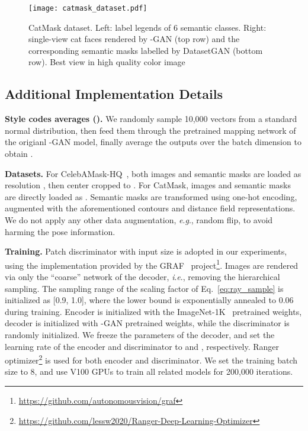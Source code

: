 \documentclass[runningheads]{llncs}
\newcommand{\ie}{\textit{i}.\textit{e}.}
\newcommand{\eg}{\textit{e}.\textit{g}.}
\begin{document}
\begin{figure}[t!]
    \centering
    \texttt{[image: catmask\_dataset.pdf]}
\caption{CatMask dataset. Left: label legends of 6 semantic classes. Right: single-view cat faces rendered by -GAN (top row) and the corresponding semantic masks labelled by DatasetGAN (bottom row). Best view in high quality color image}
\label{fig:catmask_dataset}
\end{figure}


\subsection{Additional Implementation Details} \label{sec:tech_imple}

\textbf{Style codes averages ().} We randomly sample 10,000 vectors  from a standard normal distribution, then feed them through the pretrained mapping network of the origianl -GAN model, finally average the outputs over the batch dimension to obtain .

\textbf{Datasets.} For CelebAMask-HQ~\cite{lee2020maskgan}, both images and semantic masks are loaded as resolution , then center cropped to . For CatMask, images and semantic masks are directly loaded as . Semantic masks are transformed using one-hot encoding, augmented with the aforementioned contours and distance field representations. We do not apply any other data augmentation, \eg, random flip, to avoid harming the pose information.

\textbf{Training.} Patch discriminator with input size  is adopted in our experiments, using the implementation provided by the GRAF~\cite{schwarz2020graf} project\footnote{\url{https://github.com/autonomousvision/graf}}. Images are rendered via only the ``coarse'' network of the decoder, \ie, removing the hierarchical sampling. The sampling range of the scaling factor  of Eq.~\eqref{eq:ray_sample} is initialized as [0.9, 1.0], where the lower bound is exponentially annealed to 0.06 during training. Encoder is initialized with the ImageNet-1K~\cite{deng2009imagenet} pretrained weights, decoder is initialized with -GAN pretrained weights, while the discriminator is randomly initialized.
We freeze the parameters of the decoder, and set the learning rate of the encoder and discriminator to  and , respectively. Ranger optimizer\footnote{\url{https://github.com/lessw2020/Ranger-Deep-Learning-Optimizer}} is used for both encoder and discriminator. We set the training batch size to 8, and use V100 GPUs to train all related models for 200,000 iterations.
\end{document}
